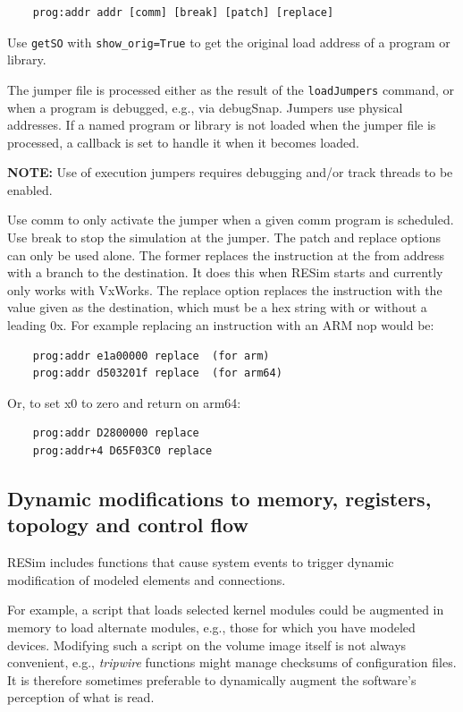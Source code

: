 \documentclass[titlepage]{article}
\begin{document}
\begin{verbatim}
    prog:addr addr [comm] [break] [patch] [replace]
\end{verbatim}
Use {\tt getSO} with {\tt show\_orig=True} to get the original load address of a program or library.

The jumper file is processed either as the result of the {\tt loadJumpers} command, or when a program
is debugged, e.g., via debugSnap.  Jumpers use physical addresses.  If a named program or library is not loaded 
when the jumper file is processed, a callback is set to handle it when it becomes loaded.  

\textbf{NOTE:} Use of execution jumpers requires debugging and/or track threads to be enabled.

Use comm to only activate the jumper when a given comm program is scheduled.  Use break to stop the
simulation at the jumper.  The patch and replace options can only be used alone.  The former
replaces the instruction at the from address with a branch to the destination.  It does this when
RESim starts and currently only works with VxWorks.  The replace option replaces the instruction
with the value given as the destination, which must be a hex string with or without a leading 0x.  
For example replacing an instruction with an ARM nop would be:
   
\begin{verbatim}
    prog:addr e1a00000 replace  (for arm)
    prog:addr d503201f replace  (for arm64)
\end{verbatim}
\noindent Or, to set x0 to zero and return on arm64:
\begin{verbatim}
    prog:addr D2800000 replace  
    prog:addr+4 D65F03C0 replace  
\end{verbatim}

\subsection{Dynamic modifications to memory, registers, topology and control flow}
\label{dmod}
RESim includes functions that cause system events to trigger dynamic modification of modeled elements and connections.

For example, a script that loads selected kernel modules could be augmented in memory to
load alternate modules, e.g., those for which you have modeled devices.  Modifying such a script on the volume
image itself is not always convenient, e.g., \textit{tripwire} functions might manage checksums of
configuration files.  It is therefore sometimes preferable to dynamically augment the software's perception of what is read.
\end{document}

